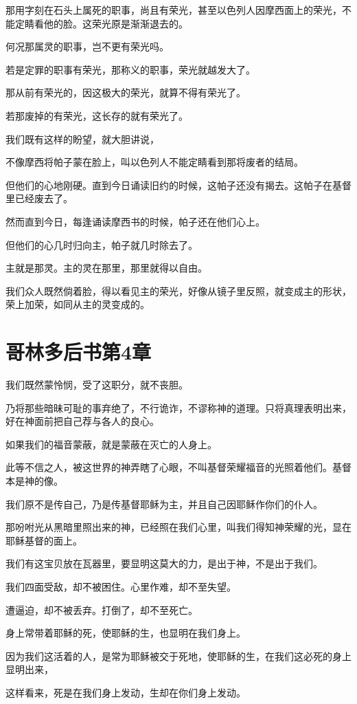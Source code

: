 \documentclass[12pt,oneside]{book}
\begin{document}
那用字刻在石头上属死的职事，尚且有荣光，甚至以色列人因摩西面上的荣光，不能定睛看他的脸。这荣光原是渐渐退去的。

何况那属灵的职事，岂不更有荣光吗。

若是定罪的职事有荣光，那称义的职事，荣光就越发大了。

那从前有荣光的，因这极大的荣光，就算不得有荣光了。

若那废掉的有荣光，这长存的就有荣光了。

我们既有这样的盼望，就大胆讲说，

不像摩西将帕子蒙在脸上，叫以色列人不能定睛看到那将废者的结局。

但他们的心地刚硬。直到今日诵读旧约的时候，这帕子还没有揭去。这帕子在基督里已经废去了。

然而直到今日，每逢诵读摩西书的时候，帕子还在他们心上。

但他们的心几时归向主，帕子就几时除去了。

主就是那灵。主的灵在那里，那里就得以自由。

我们众人既然倘着脸，得以看见主的荣光，好像从镜子里反照，就变成主的形状，荣上加荣，如同从主的灵变成的。

\chapter{哥林多后书第4章}
我们既然蒙怜悯，受了这职分，就不丧胆。

乃将那些暗昧可耻的事弃绝了，不行诡诈，不谬称神的道理。只将真理表明出来，好在神面前把自己荐与各人的良心。

如果我们的福音蒙蔽，就是蒙蔽在灭亡的人身上。

此等不信之人，被这世界的神弄瞎了心眼，不叫基督荣耀福音的光照着他们。基督本是神的像。

我们原不是传自己，乃是传基督耶稣为主，并且自己因耶稣作你们的仆人。

那吩咐光从黑暗里照出来的神，已经照在我们心里，叫我们得知神荣耀的光，显在耶稣基督的面上。

我们有这宝贝放在瓦器里，要显明这莫大的力，是出于神，不是出于我们。

我们四面受敌，却不被困住。心里作难，却不至失望。

遭逼迫，却不被丢弃。打倒了，却不至死亡。

身上常带着耶稣的死，使耶稣的生，也显明在我们身上。

因为我们这活着的人，是常为耶稣被交于死地，使耶稣的生，在我们这必死的身上显明出来，

这样看来，死是在我们身上发动，生却在你们身上发动。
\end{document}
